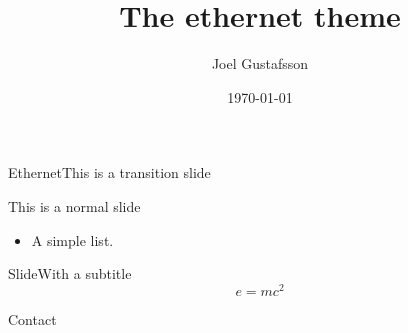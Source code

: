 \documentclass{beamer}
\title{\huge\textbf{The ethernet theme}}
\date{\today}
\author[Joel Gustafsson]{Joel Gustafsson}
\institute{University of City}
\begin{document}
\begin{frame}
  \titlepage
\end{frame}

\begin{frame}[transition]{Ethernet}{This is a transition slide}
\end{frame}


\begin{frame}{This is a normal slide}
  \begin{itemize}
    \item A simple list.
  \end{itemize}
\end{frame}

\begin{frame}{Slide}{With a subtitle}
  \begin{equation}
    e = mc^2
  \end{equation}
\end{frame}

\begin{frame}[image]{Contact}
\end{frame}
\end{document}
